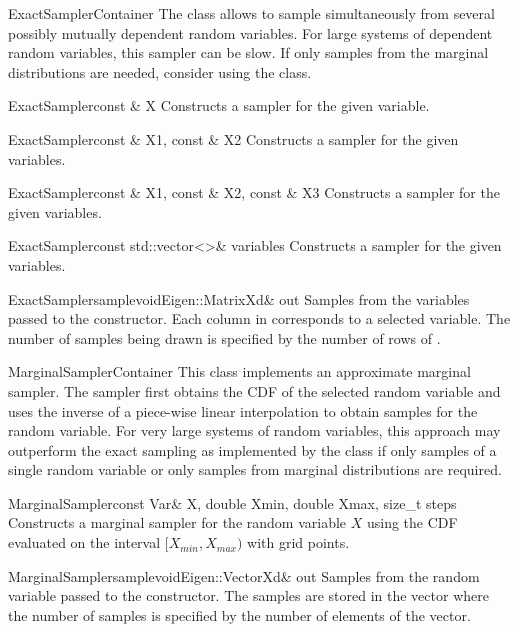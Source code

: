 \begin{defclassex}{ExactSampler}{Container}
The  class allows to sample simultaneously from several
possibly mutually dependent random variables. For large systems of dependent
random variables, this sampler can be slow. If only samples from the marginal
distributions are needed, consider using the  class.

\begin{classsyn}{ExactSampler}{const \& X}
Constructs a sampler for the given variable.
\end{classsyn}

\begin{classsyn}{ExactSampler}{const \& X1, const \& X2}
Constructs a sampler for the given variables.
\end{classsyn}

\begin{classsyn}{ExactSampler}{const \& X1, const \& X2, const \& X3}
Constructs a sampler for the given variables.
\end{classsyn}

\begin{classsyn}{ExactSampler}{const std::vector<>\& variables}
Constructs a sampler for the given variables.
\end{classsyn}

\begin{defmeth}{ExactSampler}{sample}{void}{Eigen::MatrixXd\& out}
Samples from the variables passed to the constructor. Each column in 
corresponds to a selected variable. The number of samples being drawn is
specified by the number of rows of .
\end{defmeth}
\end{defclassex}

\begin{defclassex}{MarginalSampler}{Container}
This class implements an approximate marginal sampler. The sampler first
obtains the CDF of the selected random variable and uses the inverse of a
piece-wise linear interpolation to obtain samples for the random variable. For very
large systems of random variables, this approach may outperform the exact
sampling as implemented by the  class if only samples 
of a single random variable or only samples from marginal distributions are required.

\begin{classsyn}{MarginalSampler}{const Var\& X, double Xmin, double Xmax, size\_t steps}
Constructs a marginal sampler for the random variable $X$ using the CDF evaluated on the interval $[X_{min},X_{max})$ 
with  grid points.
\end{classsyn}

\begin{defmeth}{MarginalSampler}{sample}{void}{Eigen::VectorXd\& out}
Samples from the random variable passed to the constructor. The samples are stored in the  vector where
the number of samples is specified by the number of elements of the vector.
\end{defmeth}
\end{defclassex}
